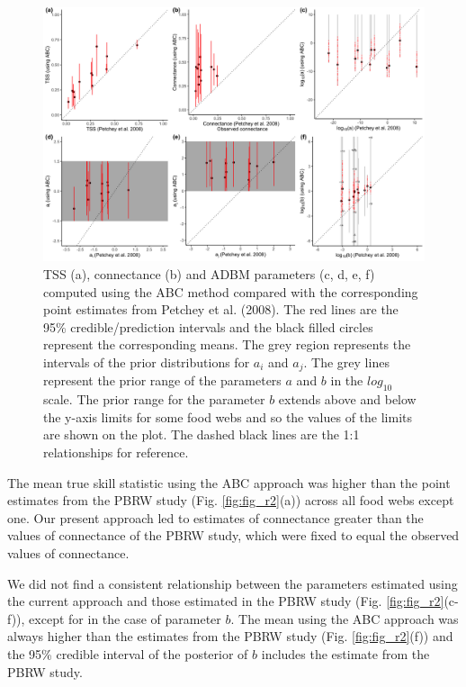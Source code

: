 \documentclass{article}
\begin{document}
\begin{figure}

{\centering \includegraphics[width=500px]{../results/misc/ABC_vs_point_estimates} 

}

\caption{\label{fig:fig_r2} TSS (a), connectance (b) and ADBM parameters (c, d, e, f) computed using the ABC method compared with the corresponding point estimates from Petchey et al. (2008). The red lines are the 95\% credible/prediction intervals and the black filled circles represent the corresponding means. The grey region represents the intervals of the prior distributions for $a_i$ and $a_j$. The grey lines represent the prior range of the parameters $a$ and $b$ in the $log_{10}$ scale. The prior range for the parameter $b$ extends above and below the y-axis limits for some food webs and so the values of the limits are shown on the plot. The dashed black lines are the 1:1 relationships for reference.}\label{fig:unnamed-chunk-7}
\end{figure}

The mean true skill statistic using the ABC approach was higher than the
point estimates from the PBRW study (Fig. \ref{fig:fig_r2}(a)) across
all food webs except one. Our present approach led to estimates of
connectance greater than the values of connectance of the PBRW study,
which were fixed to equal the observed values of connectance.

We did not find a consistent relationship between the parameters
estimated using the current approach and those estimated in the PBRW
study (Fig. \ref{fig:fig_r2}(c-f)), except for in the case of parameter
\(b\). The mean using the ABC approach was always higher than the
estimates from the PBRW study (Fig. \ref{fig:fig_r2}(f)) and the 95\%
credible interval of the posterior of \(b\) includes the estimate from
the PBRW study.
\end{document}

